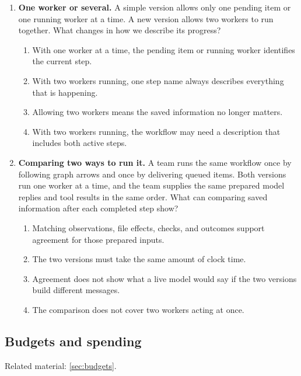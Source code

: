 \begin{enumerate}[start=41,itemsep=0.7\baselineskip]
\item\label{exercise:49} \begin{minipage}[t]{\linewidth}
\textbf{One worker or several.} A simple version allows only one pending item or one running worker at a time. A new version allows two workers to run together. What changes in how we describe its progress?
\begin{enumerate}[label=\textnormal{(\Alph*)},leftmargin=*,itemsep=0pt]
\item With one worker at a time, the pending item or running worker identifies the current step.
\item With two workers running, one step name always describes everything that is happening.
\item Allowing two workers means the saved information no longer matters.
\item With two workers running, the workflow may need a description that includes both active steps.
\end{enumerate}
\end{minipage}

\item\label{exercise:50} \begin{minipage}[t]{\linewidth}
\textbf{Comparing two ways to run it.} A team runs the same workflow once by following graph arrows and once by delivering queued items. Both versions run one worker at a time, and the team supplies the same prepared model replies and tool results in the same order. What can comparing saved information after each completed step show?
\begin{enumerate}[label=\textnormal{(\Alph*)},leftmargin=*,itemsep=0pt]
\item Matching observations, file effects, checks, and outcomes support agreement for those prepared inputs.
\item The two versions must take the same amount of clock time.
\item Agreement does not show what a live model would say if the two versions build different messages.
\item The comparison does not cover two workers acting at once.
\end{enumerate}
\end{minipage}

\end{enumerate}

\subsection{Budgets and spending}
\noindent Related material: \cref{sec:budgets}.

